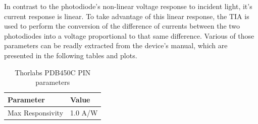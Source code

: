 In contrast to the photodiode's non-linear voltage response to incident light, it's current response is linear.
To take advantage of this linear response, the TIA is used to perform the conversion of the difference of currents between the two photodiodes into a voltage proportional to that same difference.
Various of those parameters can be readly extracted from the device's manual, which are presented in the following tables and plots.\\
%
%
%
%
\begin{table}[H]
	\centering
	\begin{tabulary}{1.0\textwidth}{|L|L|}
		\hline
		\textbf{Parameter}		& \textbf{Value}\\
		\hline
		Max Responsivity		& 1.0 A/W\\
		\hline
	\end{tabulary}
	\caption{Thorlabs PDB450C PIN parameters}
	\label{table:thorlabs}
\end{table}


